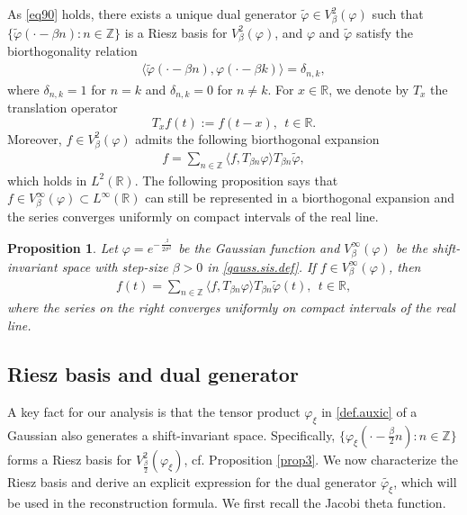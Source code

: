 \documentclass[11pt, reqno]{amsart}
\newtheorem{proposition}[theorem]{Proposition}%
\newcommand{\Z}{\mathbb{Z}}
\newcommand{\R}{\mathbb{R}}
\numberwithin{equation}{section}
\begin{document}
    As \eqref{eq90} holds,
      there exists a unique dual generator $\widetilde{\varphi} \in V_{\beta}^2(\varphi)$ such that $\{\widetilde{\varphi}(\cdot - \beta n): n\in \Z \}$ is a Riesz basis for $V_{\beta}^2(\varphi)$, and  $\varphi$ and $\widetilde{\varphi}$ satisfy the biorthogonality relation
    \begin{align*}
        \langle \widetilde{\varphi}(\cdot-\beta n), \varphi(\cdot - \beta k) \rangle = \delta_{n, k},
    \end{align*}
    where $\delta_{n,k} = 1$ for $n=k $ and $\delta_{n,k} = 0$ for $n\ne k$. For $x\in\mathbb R$, we denote by $T_x$ the translation operator
$$T_x f(t):=f(t-x), \ \ t\in\mathbb R.$$ 
Moreover, $f\in V_{\beta}^2 (\varphi)$ admits the following biorthogonal expansion 
    \begin{align*}
        f = \sum_{n\in \Z} \langle f,T_{\beta n} \varphi \rangle T_{\beta n} \widetilde{\varphi},
    \end{align*}
    which holds in $L^2(\R)$.
    The following proposition says that  $f\in V^\infty_\beta(\varphi) \subset L^\infty(\R)$ can still be represented in a biorthogonal expansion and the series converges uniformly on compact intervals of the real line. 

    \begin{proposition}\cite[Proposition 2.5]{grohs2024stable}\label{prop.bio.expa}  Let $\varphi=e^{-\frac{\cdot^2}{2\sigma^2}}$ be the Gaussian function  and $V_{\beta}^{\infty}(\varphi)$ be the shift-invariant space with step-size $\beta>0$ in \eqref{gauss.sis.def}.  
If $f \in V^\infty_\beta(\varphi)$,  then 
\begin{align}\label{bio.expa.inf}
    f(t) = \sum_{n\in \Z} \langle f, T_{\beta n}\varphi \rangle T_{\beta n}\widetilde{\varphi}(t), \ \ t\in \R,
\end{align}
where the series on the right converges uniformly on compact intervals of the real line.
\end{proposition}

    \subsection{Riesz basis and dual generator}

    A key fact for our analysis is that the tensor product $\varphi_\xi$ in \eqref{def.auxic}  of a Gaussian also generates a shift-invariant space.
    Specifically, $\{\varphi_\xi(\cdot - \frac{\beta}{2} n): n\in \mathbb Z\}$ forms a Riesz basis for $V_{\frac{\beta}{2}}^{2}(\varphi_\xi)$, cf. Proposition \ref{prop3}. We now characterize the Riesz basis  and derive an explicit expression for the dual generator $\widetilde{\varphi_\xi}$, which will be used in the reconstruction formula. We first recall the Jacobi theta function.
    
\end{document}
